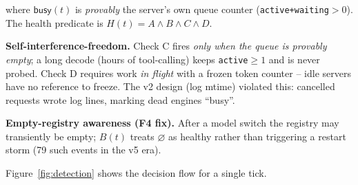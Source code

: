 \documentclass[10pt]{article}
\begin{document}
where $\textsf{busy}(t)$ is \emph{provably} the server's own queue counter (\texttt{active+waiting}$>$0). The health predicate is $H(t)=A\land B\land C\land D$.

\noindent\textbf{Self-interference-freedom.} Check C fires \emph{only when the queue is provably empty}; a long decode (hours of tool-calling) keeps \texttt{active}$\ge 1$ and is never probed. Check D requires work \emph{in flight} with a frozen token counter -- idle servers have no reference to freeze. The v2 design (log mtime) violated this: cancelled requests wrote log lines, marking dead engines ``busy''.

\noindent\textbf{Empty-registry awareness (F4 fix).} After a model switch the registry may transiently be empty; $B(t)$ treats $\varnothing$ as healthy rather than triggering a restart storm (79 such events in the v5 era).

Figure~\ref{fig:detection} shows the decision flow for a single tick.
\end{document}
